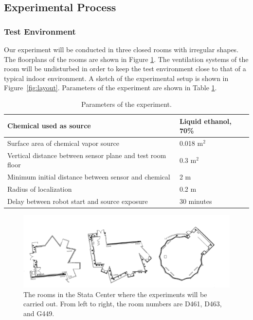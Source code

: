 \documentclass[submit, 12pt]{aiaa-pretty-modified}
\newcommand{\tablewidthtwo}[0]{3in}
\begin{document}
\subsection{Experimental Process}
\subsubsection{Test Environment}

Our experiment will be conducted in three closed rooms with irregular shapes.
The floorplans of the rooms are shown in Figure \ref{fig:floorplans}. The
ventilation systems of the room will be undisturbed in order to keep the test
environment close to that of a typical indoor environment. A sketch of the
experimental setup is shown in Figure~\ref{fig:layout}. Parameters of the
experiment are shown in Table \ref{tab:parameters}.

\begin{table}
\caption{Parameters of the experiment.}
\begin{center}
\begin{tabular}{|p{\tablewidthtwo}|p{\tablewidthtwo}|}
\hline
Chemical used as source & Liquid ethanol, 70\% \\ \hline
Surface area of chemical vapor source & 0.018 $\text{m}^2$\\ \hline
Vertical distance between sensor plane and
test room floor & 0.3 $\text{m}^2$ \\ \hline
Minimum initial distance between sensor and chemical & 2 $\text{m}$ \\ \hline
Radius of localization & 0.2 $\text{m}$ \\ \hline
Delay between robot start and source exposure & 30 minutes \\ \hline
\end{tabular}
\end{center}
\label{tab:parameters}
\end{table}

\begin{figure}
\begin{center}
\includegraphics[width=7in]{img/rooms.pdf}
\caption[Experimental room floorplan]{The rooms in the Stata Center where the experiments will
  be carried out.  From left to right, the room numbers are D461,
  D463, and G449.}
\label{fig:floorplans}
\end{center}
\end{figure}
\end{document}
